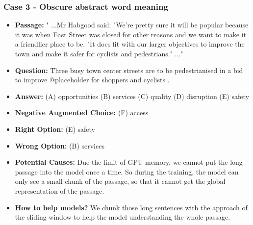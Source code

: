 \documentclass[11pt,a4paper]{article}
\begin{document}
\subsubsection*{Case 3 - Obscure abstract word meaning}
\begin{itemize}
\setlength{\itemsep}{0pt}
\setlength{\parsep}{0pt}
\setlength{\parskip}{0pt}
    \item \textbf{Passage:} " ...Mr Habgood said: "We're pretty sure it will be popular because it was when East Street was closed for other reasons and we want to make it a friendlier place to be. "It does fit with our larger objectives to improve the town and make it safer for cyclists and pedestrians." ..."
    \item \textbf{Question:} Three busy town center streets are to be pedestrianised in a bid to improve @placeholder for shoppers and cyclists .
    \item \textbf{Answer:} (A) opportunities (B) services (C) quality (D) disruption (E) safety
    \item \textbf{Negative Augmented Choice:} (F) access 
    \item \textbf{Right Option:} (E) safety
    \item \textbf{Wrong Option:} (B) services
    \item \textbf{Potential Causes:} Due the limit of GPU memory, we cannot put the long passage into the model once a time.
    So during the training, the model can only see a small chunk of the passage, so that it cannot get the global representation of the passage.
    \item\textbf{How to help models?} We chunk those long sentences with the approach of the sliding window to help the model understanding the whole passage.
\end{itemize}
\end{document}
